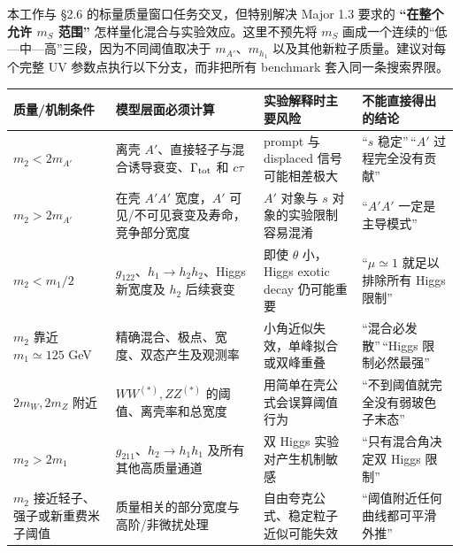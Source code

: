 \documentclass[
  chinese,
  UTF8]{ctexart}
\newcounter{none} %
\begin{document}
本工作与 §2.6 的标量质量窗口任务交叉，但特别解决 Major 1.3 要求的
\textbf{``在整个允许 \(m_S\) 范围''}
怎样量化混合与实验效应。这里不预先将 \(m_S\)
画成一个连续的``低---中---高''三段，因为不同阈值取决于
\(m_{A'}\)、\(m_{h_1}\) 以及其他新粒子质量。建议对每个完整 UV
参数点执行以下分支，而非把所有 benchmark 套入同一条搜索界限。

{\def\LTcaptype{none} %
\begin{longtable}[]{@{}
  >{\raggedright\arraybackslash}p{}
  >{\raggedright\arraybackslash}p{}
  >{\raggedright\arraybackslash}p{}
  >{\raggedright\arraybackslash}p{}@{}}
\toprule\noalign{}
\begin{minipage}[b]{\linewidth}\raggedright
质量/机制条件
\end{minipage} & \begin{minipage}[b]{\linewidth}\raggedright
模型层面必须计算
\end{minipage} & \begin{minipage}[b]{\linewidth}\raggedright
实验解释时主要风险
\end{minipage} & \begin{minipage}[b]{\linewidth}\raggedright
不能直接得出的结论
\end{minipage} \\
\midrule\noalign{}
\endhead
\bottomrule\noalign{}
\endlastfoot
\(m_2<2m_{A'}\) & 离壳
\(A'\)、直接轻子与混合诱导衰变、\(\Gamma_{\rm tot}\) 和 \(c\tau\) &
prompt 与 displaced 信号可能相差极大 & ``\(s\) 稳定''\,``\(A'\)
过程完全没有贡献'' \\
\(m_2>2m_{A'}\) & 在壳 \(A'A'\) 宽度，\(A'\)
可见/不可见衰变及寿命，竞争部分宽度 & \(A'\) 对象与 \(s\)
对象的实验限制容易混淆 & ``\(A'A'\) 一定是主导模式'' \\
\(m_2<m_1/2\) & \(g_{122}\)、\(h_1\to h_2h_2\)、Higgs 新宽度及 \(h_2\)
后续衰变 & 即使 \(\theta\) 小，Higgs exotic decay 仍可能重要 &
``\(\mu\simeq1\) 就足以排除所有 Higgs 限制'' \\
\(m_2\) 靠近 \(m_1\simeq125\) GeV &
精确混合、极点、宽度、双态产生及观测率 &
小角近似失效，单峰拟合或双峰重叠 & ``混合必发散''\,``Higgs
限制必然最强'' \\
\(2m_W,2m_Z\) 附近 & \(WW^{(*)},ZZ^{(*)}\) 的阈值、离壳率和总宽度 &
用简单在壳公式会误算阈值行为 & ``不到阈值就完全没有弱玻色子末态'' \\
\(m_2>2m_1\) & \(g_{211}\)、\(h_2\to h_1h_1\) 及所有其他高质量通道 & 双
Higgs 实验对产生机制敏感 & ``只有混合角决定双 Higgs 限制'' \\
\(m_2\) 接近轻子、强子或新重费米子阈值 &
质量相关的部分宽度与高阶/非微扰处理 & 自由夸克公式、稳定粒子近似可能失效
& ``阈值附近任何曲线都可平滑外推'' \\
\end{longtable}
}
\end{document}
